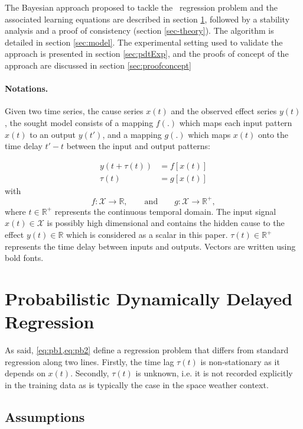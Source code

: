The Bayesian approach proposed to tackle the \XX\ regression problem and the associated learning 
equations are described in section \ref{sec-formulation}, followed by a stability analysis and a 
proof of consistency (section \ref{sec-theory}). The algorithm is detailed in section \ref{sec:model}. 
The experimental setting used to validate the approach is presented in section \ref{sec:pdtExp}, and 
the proofs of concept of the approach are discussed in section \ref{sec:proofconcept}

\paragraph{Notations.}
Given two time series, the cause series $x(t)$ and the observed effect series $y(t)$, the sought model 
consists of a mapping $f(.)$ which maps each input pattern $x(t)$ to an output $y(t')$, and a 
mapping $g(.)$ which maps $x(t)$ onto the time delay $t'-t$ between the input and output patterns:

\begin{align}
y(t + \tau(t)) & = f[x(t)]\label{eq:pb1}\\
\tau(t) & = g[x(t)]\label{eq:pb2} 
\end{align}
with
\[
f: \mathcal{X}  \rightarrow \mathbb{R},\qquad\text{and}\qquad
g: \mathcal{X}  \rightarrow \mathbb{R}^{+},
\]
where $t \in \mathbb{R}^{+}$ represents the continuous temporal domain. The input signal 
$x(t)\in \mathcal{X}$ is possibly high dimensional and contains the hidden cause to 
the effect $y(t)\in\mathbb{R}$ which is considered as a scalar in this paper. 
$\tau(t)\in \mathbb{R}^+$ represents the time delay between inputs and outputs.
Vectors are written using bold fonts.

\section{Probabilistic Dynamically Delayed Regression}\label{sec-formulation}
As said, \cref{eq:pb1,eq:pb2} define a regression problem that differs from standard regression 
along two lines. Firstly, the time lag $\tau(t)$ is non-stationary as it depends on $x(t)$.  Secondly, 
$\tau(t)$ is unknown, i.e. it is not recorded explicitly in the training data as is typically the case in 
the space weather context. 

\subsection{Assumptions}

